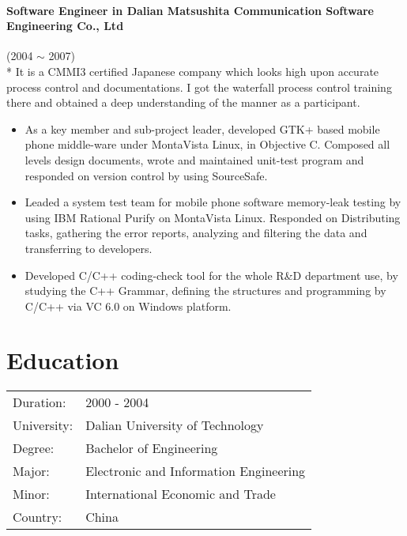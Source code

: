 \documentclass[a4paper,11pt]{article}
\begin{document}
\paragraph{Software Engineer in Dalian Matsushita Communication Software Engineering Co., Ltd} (2004 $\sim$ 2007) \\*
It is a CMMI3 certified Japanese company which looks high upon accurate process control and documentations. I got the waterfall process control training there and obtained a deep understanding of the manner as a participant. 
\begin{itemize}
\item As a key member and sub-project leader, developed GTK+ based mobile phone middle-ware under MontaVista Linux, in Objective C. Composed all levels design documents, wrote and maintained unit-test program and responded on version control by using SourceSafe.
\item Leaded a system test team for mobile phone software memory-leak testing by using IBM Rational Purify on MontaVista Linux. Responded on Distributing tasks, gathering the error reports, analyzing and filtering the data and transferring to developers.
\item Developed C/C++ coding-check tool for the whole R\&D department use, by studying the C++ Grammar, defining the structures and programming by C/C++ via VC 6.0 on Windows platform.
\end{itemize}

\section*{Education}
\begin{tabular}{l l}
Duration:   & 2000 - 2004 \\
University: & Dalian University of Technology \\
Degree:     & Bachelor of Engineering \\
Major:      & Electronic and Information Engineering \\
Minor:      & International Economic and Trade \\
Country:    & China \\
\end{tabular}
\end{document}
